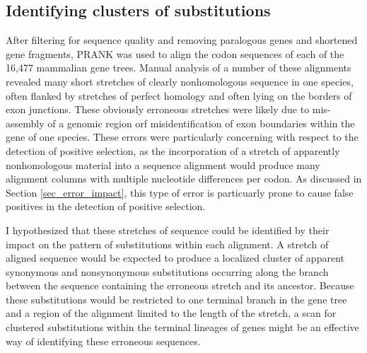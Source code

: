 \subsection{Identifying clusters of \nsyn substitutions}
\label{section_windows_clustered_subs}

After filtering for sequence quality and removing paralogous genes and
shortened gene fragments, PRANK was used to align the codon sequences
of each of the 16,477 mammalian gene trees. Manual analysis of a
number of these alignments revealed many short stretches of clearly
nonhomologous sequence in one species, often flanked by stretches of
perfect homology and often lying on the borders of exon junctions.
These obviously erroneous stretches were likely due to mis-assembly of
a genomic region orf misidentification of exon boundaries within the
gene of one species. These errors were particularly concerning with
respect to the detection of positive selection, as the incorporation
of a stretch of apparently nonhomologous material into a sequence
alignment would produce many alignment columns with multiple
nucleotide differences per codon. As discussed in Section
\ref{sec_error_impact}, this type of error is particuarly prone to
cause false positives in the detection of positive selection.

I hypothesized that these stretches of \nhom sequence could be
identified by their impact on the pattern of substitutions within each
alignment. A stretch of \nhom aligned sequence would be expected to
produce a localized cluster of apparent synonymous and nonsynonymous
substitutions occurring along the branch between the sequence
containing the erroneous stretch and its ancestor. Because these
substitutions would be restricted to one terminal branch in the gene
tree and a region of the alignment limited to the length of the \nhom
stretch, a scan for clustered substitutions within the terminal
lineages of genes might be an effective way of identifying these
erroneous sequences.

